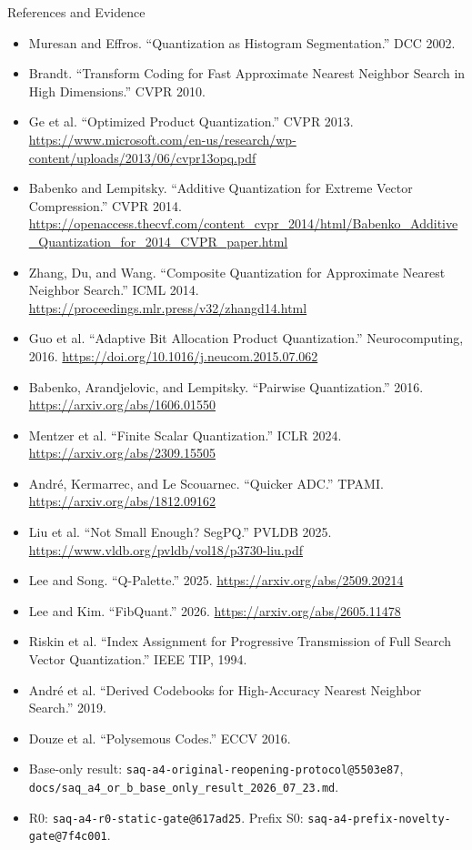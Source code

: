 \documentclass[aspectratio=169]{beamer}
\begin{document}
\begin{frame}[allowframebreaks]{References and Evidence}
\tiny
\begin{itemize}
  \item Muresan and Effros. ``Quantization as Histogram Segmentation.'' DCC 2002.
  \item Brandt. ``Transform Coding for Fast Approximate Nearest Neighbor Search in High Dimensions.'' CVPR 2010.
  \item Ge et al. ``Optimized Product Quantization.'' CVPR 2013. \url{https://www.microsoft.com/en-us/research/wp-content/uploads/2013/06/cvpr13opq.pdf}
  \item Babenko and Lempitsky. ``Additive Quantization for Extreme Vector Compression.'' CVPR 2014. \url{https://openaccess.thecvf.com/content_cvpr_2014/html/Babenko_Additive_Quantization_for_2014_CVPR_paper.html}
  \item Zhang, Du, and Wang. ``Composite Quantization for Approximate Nearest Neighbor Search.'' ICML 2014. \url{https://proceedings.mlr.press/v32/zhangd14.html}
  \item Guo et al. ``Adaptive Bit Allocation Product Quantization.'' Neurocomputing, 2016. \url{https://doi.org/10.1016/j.neucom.2015.07.062}
  \item Babenko, Arandjelovic, and Lempitsky. ``Pairwise Quantization.'' 2016. \url{https://arxiv.org/abs/1606.01550}
  \item Mentzer et al. ``Finite Scalar Quantization.'' ICLR 2024. \url{https://arxiv.org/abs/2309.15505}
  \item André, Kermarrec, and Le Scouarnec. ``Quicker ADC.'' TPAMI. \url{https://arxiv.org/abs/1812.09162}
  \item Liu et al. ``Not Small Enough? SegPQ.'' PVLDB 2025. \url{https://www.vldb.org/pvldb/vol18/p3730-liu.pdf}
  \item Lee and Song. ``Q-Palette.'' 2025. \url{https://arxiv.org/abs/2509.20214}
  \item Lee and Kim. ``FibQuant.'' 2026. \url{https://arxiv.org/abs/2605.11478}
  \item Riskin et al. ``Index Assignment for Progressive Transmission of Full Search Vector Quantization.'' IEEE TIP, 1994.
  \item André et al. ``Derived Codebooks for High-Accuracy Nearest Neighbor Search.'' 2019.
  \item Douze et al. ``Polysemous Codes.'' ECCV 2016.
  \item Base-only result: \texttt{saq-a4-original-reopening-protocol@5503e87}, \texttt{docs/saq\_a4\_or\_b\_base\_only\_result\_2026\_07\_23.md}.
  \item R0: \texttt{saq-a4-r0-static-gate@617ad25}. Prefix S0: \texttt{saq-a4-prefix-novelty-gate@7f4c001}.
\end{itemize}
\end{frame}
\end{document}
